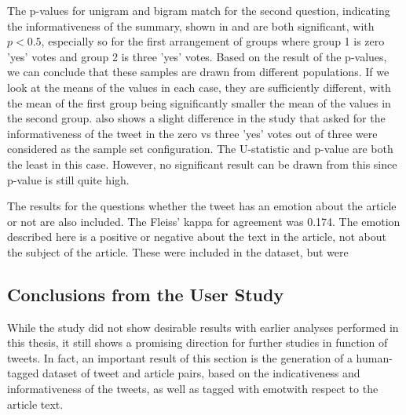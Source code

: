 The p-values for unigram and bigram match for the second question, indicating the informativeness of the summary, shown in  and  are both significant, with $p<0.5$, especially so for the first arrangement of groups where group 1 is zero 'yes' votes and group 2 is three 'yes' votes. Based on the result of the p-values, we can conclude that these samples are drawn from different populations. If we look at the means of the values in each case, they are sufficiently different, with the mean of the first group being significantly smaller the mean of the values in the second group.  also shows a slight difference in the study that asked for the informativeness of the tweet in the zero vs three 'yes' votes out of three were considered as the sample set configuration. The U-statistic and p-value are both the least in this case. However, no significant result can be drawn from this since p-value is still quite high. 


The results for the questions whether the tweet has an emotion about the article or not are also included. The Fleiss' kappa for agreement was 0.174. The emotion described here is a positive or negative about the text in the article, not about the subject of the article. These were included in the dataset, but were 
 

\subsection{Conclusions from the User Study}

While the study did not show desirable results with earlier analyses performed in this thesis, it still shows a promising direction for further studies in function of tweets. In fact, an important result of this section is the generation of a human-tagged dataset of tweet and article pairs, based on the indicativeness and informativeness of the tweets, as well as tagged with emotwith respect to the article text. 

